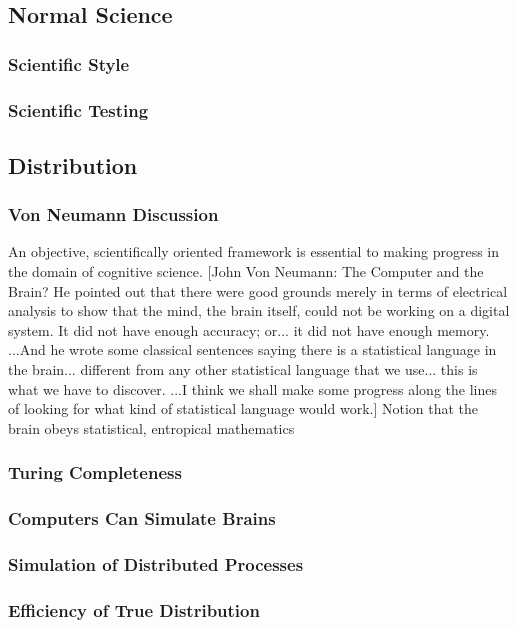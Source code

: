 \documentclass[a4paper]{article}
\begin{document}
    \subsection{Normal Science}
        \subsubsection{Scientific Style}
        \subsubsection{Scientific Testing}
    \subsection{Distribution}
        \subsubsection{Von Neumann Discussion}

    An objective, scientifically oriented framework is essential to making progress in the domain of cognitive science.
    [John Von Neumann: The Computer and the Brain?
    He pointed out that there were good grounds merely in terms of electrical analysis to show that the mind, the brain itself, could not be working on a digital system. It did not have enough accuracy; or... it did not have enough memory. ...And he wrote some classical sentences saying there is a statistical language in the brain... different from any other statistical language that we use... this is what we have to discover. ...I think we shall make some progress along the lines of looking for what kind of statistical language would work.]
    Notion that the brain obeys statistical, entropical mathematics

        \subsubsection{Turing Completeness}
        \subsubsection{Computers Can Simulate Brains}
        \subsubsection{Simulation of Distributed Processes}
        \subsubsection{Efficiency of True Distribution}
\end{document}
